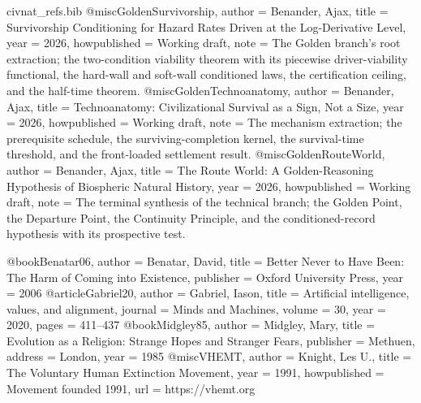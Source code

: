 \begin{filecontents}[overwrite]{civnat_refs.bib}
@misc{GoldenSurvivorship,
  author       = {Benander, Ajax},
  title        = {Survivorship Conditioning for Hazard Rates Driven at the Log-Derivative Level},
  year         = {2026},
  howpublished = {Working draft},
  note         = {The Golden branch's root extraction; the two-condition viability
                  theorem with its piecewise driver-viability functional, the
                  hard-wall and soft-wall conditioned laws, the certification
                  ceiling, and the half-time theorem.}
}
@misc{GoldenTechnoanatomy,
  author       = {Benander, Ajax},
  title        = {Technoanatomy: Civilizational Survival as a Sign, Not a Size},
  year         = {2026},
  howpublished = {Working draft},
  note         = {The mechanism extraction; the prerequisite schedule, the
                  surviving-completion kernel, the survival-time threshold, and the
                  front-loaded settlement result.}
}
@misc{GoldenRouteWorld,
  author       = {Benander, Ajax},
  title        = {The Route World: A Golden-Reasoning Hypothesis of Biospheric Natural History},
  year         = {2026},
  howpublished = {Working draft},
  note         = {The terminal synthesis of the technical branch; the Golden Point,
                  the Departure Point, the Continuity Principle, and the
                  conditioned-record hypothesis with its prospective test.}
}

@book{Benatar06,
  author    = {Benatar, David},
  title     = {Better Never to Have Been: The Harm of Coming into Existence},
  publisher = {Oxford University Press},
  year      = {2006}
}
@article{Gabriel20,
  author  = {Gabriel, Iason},
  title   = {Artificial intelligence, values, and alignment},
  journal = {Minds and Machines},
  volume  = {30},
  year    = {2020},
  pages   = {411--437}
}
@book{Midgley85,
  author    = {Midgley, Mary},
  title     = {Evolution as a Religion: Strange Hopes and Stranger Fears},
  publisher = {Methuen},
  address   = {London},
  year      = {1985}
}
@misc{VHEMT,
  author       = {Knight, Les U.},
  title        = {The Voluntary Human Extinction Movement},
  year         = {1991},
  howpublished = {Movement founded 1991},
  url          = {https://vhemt.org}
}
\end{filecontents}
